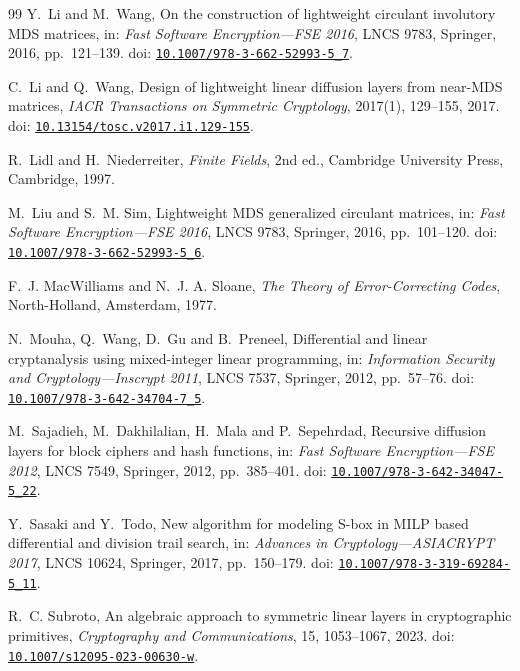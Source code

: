 \documentclass[10pt,reqno]{amsart}
\theoremstyle{plain}
\theoremstyle{remark}\newtheorem{remark}[theorem]{Remark}
\theoremstyle{definition}\newtheorem{definition}[theorem]{Definition}
\begin{document}
\begin{thebibliography}{99}
Y.~Li and M.~Wang,
On the construction of lightweight circulant involutory MDS matrices,
in: \emph{Fast Software Encryption---FSE 2016},
LNCS 9783, Springer, 2016, pp.~121--139. doi: \href{https://doi.org/10.1007/978-3-662-52993-5_7}{\nolinkurl{10.1007/978-3-662-52993-5_7}}.

C.~Li and Q.~Wang,
Design of lightweight linear diffusion layers from near-MDS matrices,
\emph{IACR Transactions on Symmetric Cryptology},
2017(1), 129--155, 2017. doi: \href{https://doi.org/10.13154/tosc.v2017.i1.129-155}{\nolinkurl{10.13154/tosc.v2017.i1.129-155}}.

R.~Lidl and H.~Niederreiter,
\emph{Finite Fields}, 2nd ed.,
Cambridge University Press, Cambridge, 1997.

M.~Liu and S.~M. Sim,
Lightweight MDS generalized circulant matrices,
in: \emph{Fast Software Encryption---FSE 2016},
LNCS 9783, Springer, 2016, pp.~101--120. doi: \href{https://doi.org/10.1007/978-3-662-52993-5_6}{\nolinkurl{10.1007/978-3-662-52993-5_6}}.

F.~J. MacWilliams and N.~J. A. Sloane,
\emph{The Theory of Error-Correcting Codes},
North-Holland, Amsterdam, 1977.

N.~Mouha, Q.~Wang, D.~Gu and B.~Preneel,
Differential and linear cryptanalysis using mixed-integer linear programming,
in: \emph{Information Security and Cryptology---Inscrypt 2011},
LNCS 7537, Springer, 2012, pp.~57--76. doi: \href{https://doi.org/10.1007/978-3-642-34704-7_5}{\nolinkurl{10.1007/978-3-642-34704-7_5}}.

M.~Sajadieh, M.~Dakhilalian, H.~Mala and P.~Sepehrdad,
Recursive diffusion layers for block ciphers and hash functions,
in: \emph{Fast Software Encryption---FSE 2012},
LNCS 7549, Springer, 2012, pp.~385--401. doi: \href{https://doi.org/10.1007/978-3-642-34047-5_22}{\nolinkurl{10.1007/978-3-642-34047-5_22}}.

Y.~Sasaki and Y.~Todo,
New algorithm for modeling S-box in MILP based differential and division
trail search,
in: \emph{Advances in Cryptology---ASIACRYPT 2017},
LNCS 10624, Springer, 2017, pp.~150--179. doi: \href{https://doi.org/10.1007/978-3-319-69284-5_11}{\nolinkurl{10.1007/978-3-319-69284-5_11}}.

R.~C. Subroto,
An algebraic approach to symmetric linear layers in cryptographic primitives,
\emph{Cryptography and Communications},
15, 1053--1067, 2023. doi: \href{https://doi.org/10.1007/s12095-023-00630-w}{\nolinkurl{10.1007/s12095-023-00630-w}}.


\end{thebibliography}
\end{document}
